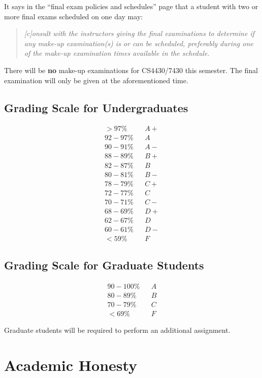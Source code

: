\documentclass[11pt]{article}
\begin{document}
It says in the ``final exam policies and schedules'' page that a student with two or more final exams scheduled on one day may:
\begin{quote}
{\it [c]onsult with the instructors giving the final examinations to determine if any make-up examination(s) is or can be scheduled, preferably during one of the make-up examination times available in the schedule.}
\end{quote}
There will be {\bf no} make-up examinations for CS4430/7430 this semester. The final examination will only be given at the aforementioned time.


\subsection*{Grading Scale for Undergraduates}
\[
\begin{array}{lcl}
> 97\%	&&A+ \\
92-97\%	&&A \\
90-91\%	&&A- \\
88-89\%	&&B+ \\
82-87\%	&&B \\
80-81\%	&&B- \\
78-79\%	&&C+ \\
72-77\%	&&C \\
70-71\%	&&C- \\
68-69\%	&&D+ \\
62-67\%	&&D \\
60-61\%	&&D- \\
< 59\%	&&F
\end{array}
\]

\subsection*{Grading Scale for Graduate Students} 

\[
\begin{array}{lcl}
90-100\%	&&A\\
80-89\%	&&B\\
70-79\%	&&C\\
< 69\%	&&F
\end{array}
\]

Graduate students will be required to perform an additional assignment.

\section{Academic Honesty	}
\end{document}
